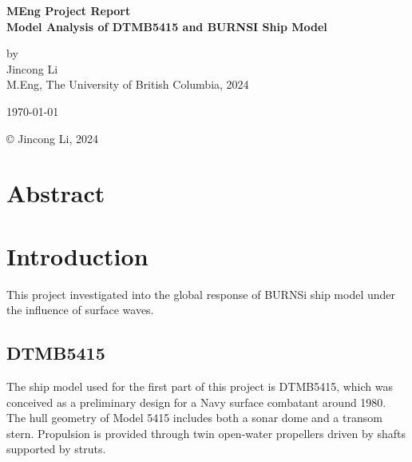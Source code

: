 \documentclass[12pt]{article} %
\begin{document}
\setlength{\parskip}{1em} 
\setlength{\parindent}{0pt}
\newcommand{\vect}[1]{\mathbf{#1}}

\begin{titlepage}  %
    \centering    %

    \vspace*{2cm}
    
    \normalsize \textbf{MEng Project Report} \\
    \vspace{0.5cm}  %
    \normalsize\textbf{Model Analysis of DTMB5415 and BURNSI Ship Model} \\
    \vspace{2cm}  %
    
    \normalsize by\\
    \vspace{1cm}
    \normalsize Jincong Li \\ 
    \vspace{1cm}
    \normalsize M.Eng, The University of British Columbia, 2024
    \vspace{11cm}  %
    
    \normalsize \today

    \vfill  %
    © Jincong Li, 2024
\end{titlepage}
\tableofcontents
\newpage
\section{Abstract}

\section{Introduction}
This project investigated into the global response of BURNSi ship model under the influence of surface waves.

\subsection{DTMB5415}

The ship model used for the first part of this project is DTMB5415, which was conceived as a preliminary design for a Navy surface combatant around 1980. The hull geometry of Model 5415 includes both a sonar dome and a transom stern. Propulsion is provided through twin open-water propellers driven by shafts supported by struts.
\end{document}
